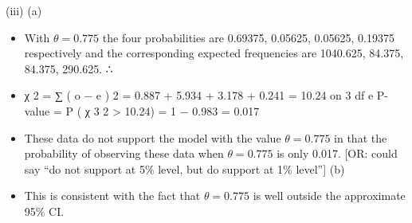 \documentclass[a4paper,12pt]{article}
\begin{document}
 (iii)
(a)
\begin{itemize}
    \item With $\theta = 0.775$ the four probabilities are 0.69375, 0.05625, 0.05625, 0.19375 respectively
and the corresponding expected frequencies are 1040.625, 84.375, 84.375, 290.625.
∴\item χ 2 = ∑
( o − e ) 2
= 0.887 + 5.934 + 3.178 + 0.241 = 10.24 on 3 df
e
P-value = P ( χ 3 2 > 10.24) = 1 − 0.983 = 0.017
\item These data do not support the model with the value $\theta = 0.775$ in that the probability of observing these data when $\theta = 0.775$ is only 0.017.
[OR: could say “do not support at 5\% level, but do support at 1\% level”]
(b)
\item This is consistent with the fact that $\theta = 0.775$ is well outside the approximate 95\% CI.
\end{itemize}
\end{document}
